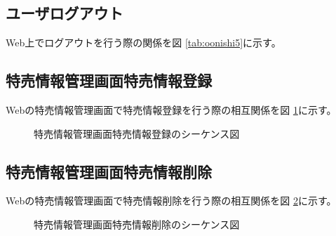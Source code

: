 \documentclass[a4j]{jarticle}
\begin{document}
\subsection{ユーザログアウト}%
Web上でログアウトを行う際の関係を図 \ref {tab:oonishi5}に示す。
\subsection{特売情報管理画面特売情報登録}
Webの特売情報管理画面で特売情報登録を行う際の相互関係を図 \ref {tab:oonishi21}に示す。
\begin{figure}[hb]
\begin{center}
\caption{特売情報管理画面特売情報登録のシーケンス図}
\label{tab:oonishi21}
\end{center}
\end{figure}
\subsection{特売情報管理画面特売情報削除}
Webの特売情報管理画面で特売情報削除を行う際の相互関係を図 \ref {tab:oonishi22}に示す。
\begin{figure}[hb]
\begin{center}
\caption{特売情報管理画面特売情報削除のシーケンス図}
\label{tab:oonishi22}
\end{center}
\end{figure}
\end{document}
